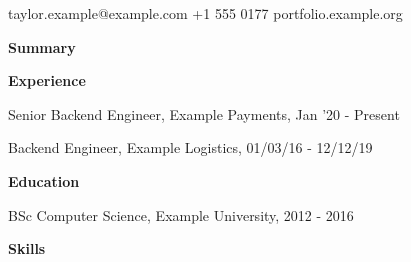 \documentclass[10pt]{article}
\begin{document}
{\LARGE \Person}\par taylor.example@example.com \quad +1 555 0177 \quad portfolio.example.org\par\bigskip
\textbf{Summary}\par \Summary\par\medskip
\textbf{Experience}\par Senior Backend Engineer, Example Payments, Jan '20 - Present\par
\JobA\par \JobB\par\medskip
Backend Engineer, Example Logistics, 01/03/16 - 12/12/19\par
\JobC\par\medskip
\textbf{Education}\par BSc Computer Science, Example University, 2012 - 2016\par\medskip
\textbf{Skills}\par \SkillsLine\par
\end{document}
